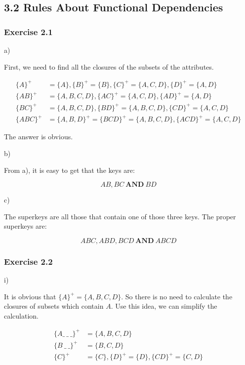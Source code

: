 \documentclass[../../main.tex]{subfiles}
\begin{document}
\subsection*{3.2 Rules About Functional Dependencies}

\subsubsection*{Exercise 2.1}

a)

First, we need to find all the closures of the subsets
of the attributes.

\begin{align*}
  \{A\}^{+} &= \{A\},   \{B\}^{+} = \{B\},
  \{C\}^{+} = \{A, C, D\}, \{D\}^{+}= \{A,D\} \\
  \{AB\}^{+} &= \{A,B,C,D\},  \{AC\}^{+} = \{A,C,D\},
  \{AD\}^{+} = \{A,D\} \\
  \{BC\}^{+} &= \{A,B,C,D\}, \{BD\}^{+} = \{A,B,C,D\},
  \{CD\}^{+} = \{A,C,D\} \\
  \{ABC\}^{+} &= \{A,B,D\}^{+} = \{BCD\}^{+} = \{A,B,C,D\},
  \{ACD\}^{+} = \{A,C,D\}
\end{align*}

The answer is obvious.

b)

From a), it is easy to get that the keys are:

$$
AB, BC \ \mathbf{AND} \ BD
$$

c)

The superkeys are all those that contain one of those three
keys. The proper superkeys are:

$$
ABC, ABD, BCD \ \mathbf{AND} \ ABCD
$$

\subsubsection*{Exercise 2.2}

i)

It is obvious that $\{A\}^{+} = \{A,B,C,D\}$. So there is no
need to calculate the closures of subsets which contain $A$.
Use this idea, we can simplify the calculation.

\begin{align*}
  \{A \_ \ \_ \ \_ \}^{+} &= \{A,B,C,D\} \\
  \{B \ \_ \ \_ \}^{+} &= \{B,C,D\} \\
  \{C\}^{+} &= \{C\}, \{D\}^{+} = \{D\}, \{CD\}^{+} = \{C,D\}
\end{align*}
\end{document}

